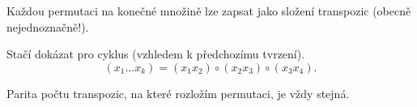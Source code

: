 \documentclass[12pt]{article}					%
\begin{document}
    \begin{tvrzeni}
        Každou permutaci na konečné množině lze zapsat jako složení transpozic (obecně nejednoznačně!).

        \begin{dukazin}
            Stačí dokázat pro cyklus (vzhledem k předchozímu tvrzení).
            $$ (x_1 … x_k) = (x_1 x_2)\circ(x_2 x_3)\circ(x_3 x_4). $$ 
        \end{dukazin}
    \end{tvrzeni}

    \begin{poznamka}
        Parita počtu transpozic, na které rozložím permutaci, je vždy stejná.
    \end{poznamka}
\end{document}
